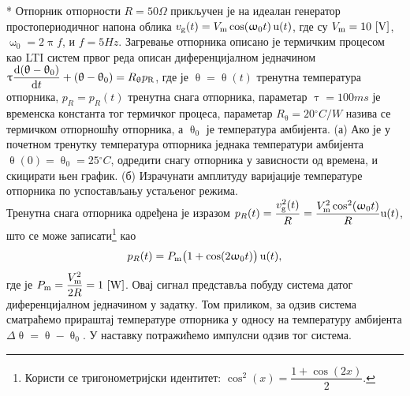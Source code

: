 {\color{red}*}\PID
Отпорник отпорности $R = 50\unit{\Omega}$ прикључен је на идеалан генератор простопериодичног напона облика 
$v_{\rm g}(t) = V_{\rm m} \cos(\upomega_0 t)\,{\rm u}(t)$, где су $V_{\rm m} = 10\,\left[\mathrm{V}\right]$, 
$\upomega_0 = 2\uppi f$, и $f = 5\unit{Hz}$. Загревање отпорника описано је термичким 
процесом као LTI систем првог реда описан диференцијалном једначином 
$\uptau \dfrac{{\rm d} (\uptheta-\uptheta_0)}{{\rm d} t} + (\uptheta-\uptheta_0) = R_{\uptheta} p_{\rm R}$, где је 
$\uptheta = \uptheta(t)$ тренутна температура отпорника, 
$p_R = p_R(t)$ тренутна снага отпорника, параметар
$\uptau = 100\unit{ms}$ је временска константа тог термичког процеса,
 параметар $R_{\uptheta} = 20\unit{^\circ C/W}$ назива се термичком отпорношћу 
отпорника, а $\uptheta_0$ је температура амбијента. 
(а) Ако је у почетном тренутку температура отпорника једнака температури амбијента $\uptheta(0) = \uptheta_0 = 25\unit{^\circ C}$,
одредити снагу отпорника у зависности од времена, и скицирати њен график. 
(б) Израчунати амплитуду варијације температуре отпорника по успостављању 
устаљеног режима. 
\\[2mm]

\textsc{}
Тренутна снага отпорника одређена је изразом 
$p_{R}(t) = \dfrac{v_{\rm g}^2(t)}{R} = \dfrac{V_{\rm m}^2 \cos^2(\upomega_0 t)}{R} {\rm u}(t)$, што се може 
записати\footnote{
    Користи се тригонометријски идентитет: $\cos^2(x) = \dfrac{1 + \cos(2x)}{2}$.
}
као 
\begin{equation}
    p_{R}(t) = P_{\rm m} \bigl(1 + \cos(2\upomega_0 t) \bigr) \, \uu(t), \label{eq:\ID.1}
\end{equation} 
где је 
$P_{\rm m} = \dfrac{V_{\rm m}^2}{2R} = 1\,\left[\mathrm{W}\right]$. Овај сигнал представља побуду система датог диференцијалном
једначином у задатку. Том приликом, за одзив система сматраћемо прираштај температуре отпорника у односу 
на температуру амбијента $\Delta\uptheta = \uptheta - \uptheta_0$. У наставку потражићемо импулсни одзив тог система. 

